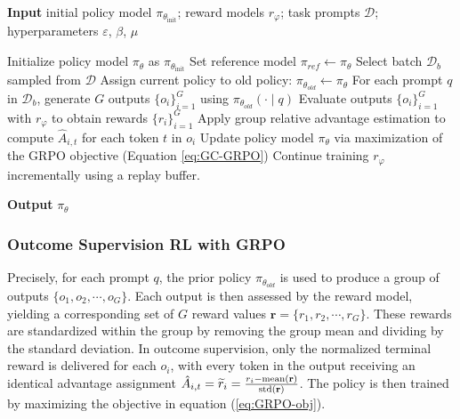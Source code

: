 \begin{algorithm}[t]
  \small
  \caption{Iterative Group Relative Policy Optimization}
  \textbf{Input} initial policy model $\pi_{\theta_{\text{init}}}$; reward models $r_\varphi$; task prompts $\mathcal{D}$; 
  hyperparameters $\varepsilon$, $\beta$, $\mu$
  \begin{algorithmic}[1]
    \State Initialize policy model $\pi_\theta$ as $\pi_{\theta_{\text{init}}}$
       \State Set reference model $\pi_{ref} \leftarrow \pi_{\theta}$
      \State Select batch $\mathcal{D}_b$ sampled from $\mathcal{D}$
      \State Assign current policy to old policy: $\pi_{\theta_{old}} \leftarrow \pi_{\theta}$
      \State For each prompt $q$ in $\mathcal{D}_b$, generate $G$ outputs $\{o_i\}_{i=1}^G$ using $\pi_{\theta_{old}} (\cdot \mid q)$
      \State Evaluate outputs $\{o_i\}_{i=1}^G$ with $r_{\varphi}$ to obtain rewards $\{r_i\}_{i=1}^G$
      \State Apply group relative advantage estimation to compute $\hat{A}_{i,t}$ for each token $t$ in $o_i$
        \State Update policy model $\pi_{\theta}$ via maximization of the GRPO objective (Equation \ref{eq:GC-GRPO})
      \EndFor
    \EndFor \State Continue training $r_\varphi$ incrementally using a replay buffer. 
    \EndFor 
  \end{algorithmic}
  \textbf{Output} $\pi_\theta$
  \label{alg:iter-grpo}
\end{algorithm}

\subsubsection{Outcome Supervision RL with GRPO} Precisely, for each prompt $q$, the prior policy $\pi_{\theta_{old}}$ is used to produce a group of outputs $\{o_1, o_2, \cdots, o_G\}$. Each output is then assessed by the reward model, yielding a corresponding set of $G$ reward values $\mathbf{r}=\{r_1, r_2, \cdots, r_G\}$. These rewards are standardized within the group by removing the group mean and dividing by the standard deviation. In outcome supervision, only the normalized terminal reward is delivered for each $o_i$, with every token in the output receiving an identical advantage assignment $\hat{A}_{i, t} = \widetilde{r}_i = \frac{r_i- {\rm mean}(\mathbf{r})}{{\rm std}(\mathbf{r})}$. The policy is then trained by maximizing the objective in equation (\ref{eq:GRPO-obj}).

